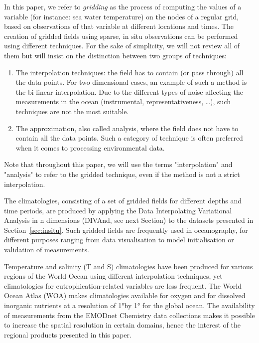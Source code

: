 \documentclass[essd,manuscript]{copernicus}
\begin{document}
In this paper, we refer to \textit{gridding} as the process of computing the values of a variable (for instance: sea water temperature) on the nodes of a regular grid, based on observations of that variable at different locations and times. The creation of gridded fields using sparse, in situ observations can be performed using different techniques. For the sake of simplicity, we will not review all of them but will insist on the distinction between two groups of techniques:
\begin{enumerate}
\item The interpolation techniques: the field has to contain (or pass through) all the data points. For two-dimensional cases, an example of such a method is the bi-linear interpolation. Due to the different types of noise affecting the measurements in the ocean (instrumental, representativeness, \ldots), such techniques are not the most suitable.
\item The approximation, also called analysis, where the field does not have to contain all the data points. Such a category of technique is often preferred when it comes to processing environmental data.
\end{enumerate}

Note that throughout this paper, we will use the terms "interpolation" and "analysis" to refer to the gridded technique, even if the method is not a strict interpolation.

The climatologies, consisting of a set of gridded fields for different depths and time periods, are produced by applying the Data Interpolating Variational Analysis in n dimensions (DIVAnd, see next Section) to the datasets presented in Section~\ref{sec:insitu}. Such gridded fields are frequently used in oceanography, for different purposes ranging from data visualisation to model initialisation or validation of measurements.  

Temperature and salinity (T and S) climatologies have been produced for various regions of the World Ocean using different interpolation techniques, yet climatologies for eutrophication-related variables are less frequent. The World Ocean Atlas (WOA) makes climatologies available for oxygen \citep[Dissolved Oxygen, Apparent Oxygen Utilization, and Oxygen Saturation,][]{Garcia2024} and for dissolved inorganic nutrients \citep[phosphate, nitrate and nitrate + nitrite, silicate,][]{Garcia2024b} at a resolution of 1°by 1° for the global ocean. The availability of measurements from the EMODnet Chemistry data collections makes it possible to increase the spatial resolution in certain domains, hence the interest of the regional products presented in this paper.
\end{document}
